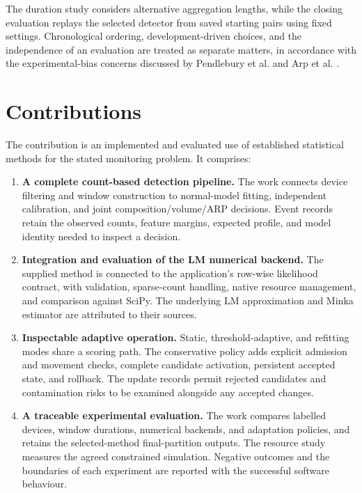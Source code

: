 The duration study considers alternative
aggregation lengths, while the closing evaluation replays the selected
detector from saved starting pairs using fixed settings. Chronological
ordering, development-driven choices, and the independence of an evaluation
are treated as separate matters, in accordance with the experimental-bias
concerns discussed by Pendlebury et al. and Arp et al.
\cite{pendlebury2019,arp2022}.

\section{Contributions}

The contribution is an implemented and evaluated use of established
statistical methods for the stated monitoring problem. It comprises:
\begin{enumerate}
  \item \textbf{A complete count-based detection pipeline.} The work connects
  device filtering and window construction to normal-model fitting,
  independent calibration, and joint composition/volume/ARP decisions.
  Event records retain the observed counts, feature margins, expected
  profile, and model identity needed to inspect a decision.
  \item \textbf{Integration and evaluation of the LM numerical backend.}
  The supplied method is connected to the application's row-wise
  likelihood contract, with validation, sparse-count handling, native
  resource management, and comparison against SciPy. The underlying LM
  approximation and Minka estimator are attributed to their sources.
  \item \textbf{Inspectable adaptive operation.} Static, threshold-adaptive,
  and refitting modes share a scoring path. The conservative policy adds
  explicit admission and movement checks, complete candidate activation,
  persistent accepted state, and rollback. The update records permit
  rejected candidates and contamination risks to be examined alongside
  any accepted changes.
  \item \textbf{A traceable experimental evaluation.} The work compares
  labelled devices, window durations, numerical backends, and adaptation
  policies, and retains the selected-method final-partition outputs.
  The resource study measures the agreed constrained simulation. Negative
  outcomes and the boundaries of each experiment are reported with the
  successful software behaviour.
\end{enumerate}

